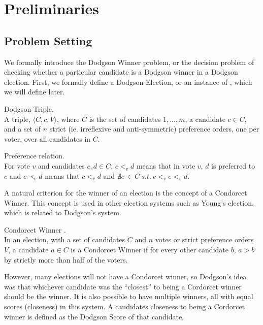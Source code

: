 \section{Preliminaries}

\subsection{Problem Setting}

We formally introduce the Dodgson Winner problem, or the decision problem
of checking whether a particular candidate is a Dodgson winner in a
Dodgson election.
First, we formally define a Dodgson Election, or an instance of \dwin, which we
will define later.

\begin{defn}{Dodgson Triple.}\\
    A triple, $\langle C, c, V \rangle$, where $C$ is the set of candidates
    $1, \dots , m$, a candidate $c \in C$, and a set of $n$ strict
    (ie. irreflexive and anti-symmetric) preference orders,
    one per voter, over all candidates in $C$.
\end{defn}

\begin{defn}{Preference relation.} \\
    For vote $v$ and candidates $c,d \in C$, $c<_{v}d$ means that in vote
$v$, $d$ is preferred to $c$ and $c\prec_v d$ means that $c<_v d$ and
$\nexists e ~ \in C ~ s.t. ~ c <_v e <_v d$.
\end{defn}

A natural criterion for the winner of an election
is the concept of a Condorcet Winner.
This concept is used in other election systems such as Young's election, which
is related to Dodgson's system.

\begin{defn}{Condorcet Winner} \citep{condorcet1785essay}.\\
    In an election, with a set of candidates $C$ and $n$ votes or strict preference
    orders $V$, a candidate $a \in C$ is a Condorcet Winner if for every other
    candidate $b$, $a > b$ by strictly more than half of the voters.
\end{defn}

However, many elections will not have a Condorcet winner, so Dodgson's idea
was that whichever candidate was the ``closest'' to being a Cordorcet winner
should be the winner.
It is also possible to have multiple winners, all with equal scores (closeness)
in this system.
A candidates closeness to being a Cordorcet winner is defined as the Dodgson Score
of that candidate.

